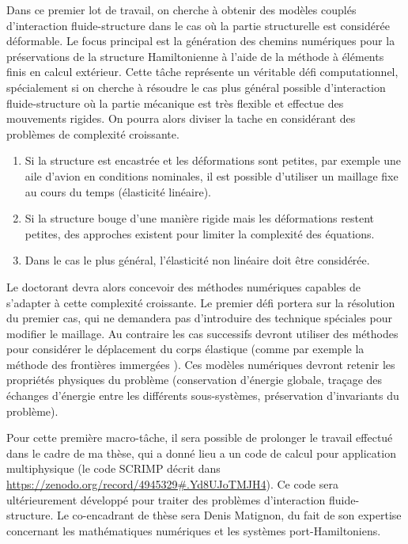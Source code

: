 \documentclass[12pt, french]{article}
\begin{document}
	Dans ce premier lot de travail, on cherche à obtenir des modèles couplés d'interaction fluide-structure dans le cas où la partie structurelle est considérée déformable. Le focus principal est la génération des chemins numériques pour la préservations de la structure Hamiltonienne à l'aide de la méthode à éléments finis en calcul extérieur. Cette t\^ache représente un véritable défi computationnel, spécialement si on cherche à résoudre le cas plus général possible d'interaction fluide-structure où la partie mécanique est très flexible et effectue des mouvements rigides. On pourra alors diviser la tache en considérant des problèmes de complexité croissante. 
	\begin{enumerate}
		\item Si la structure est encastrée et les déformations sont petites, par exemple une aile d'avion en conditions nominales, il est possible d'utiliser un maillage fixe au cours du temps (élasticité linéaire). 
		\item Si la structure bouge d'une manière rigide mais les déformations restent petites, des approches existent pour limiter la complexité des équations.
		\item Dans le cas le plus général, l'élasticité non linéaire doit être considérée.
	\end{enumerate}
	Le doctorant devra alors concevoir des méthodes numériques capables de s'adapter à cette complexité croissante. Le premier défi portera sur la résolution du premier cas, qui ne demandera pas d'introduire des technique spéciales pour modifier le maillage. Au contraire les cas successifs devront utiliser des méthodes pour considérer le déplacement du corps élastique (comme par exemple la méthode des frontières immergées \cite{peskin2002}). Ces modèles numériques devront retenir les propriétés physiques du problème (conservation d'énergie globale, traçage des échanges d'énergie entre les différents sous-systèmes, préservation d'invariants du problème).
	
	Pour cette première macro-tâche, il sera possible de prolonger le travail effectué dans le cadre de ma thèse, qui a donn\'e lieu a un code de calcul pour application multiphysique (le code SCRIMP décrit dans \url{https://zenodo.org/record/4945329#.Yd8UJoTMJH4}). Ce code sera ultérieurement développé pour traiter des problèmes d'interaction fluide-structure. Le co-encadrant de thèse sera Denis Matignon, du fait de son expertise concernant les mathématiques numériques et les systèmes port-Hamiltoniens.
	
\end{document}
